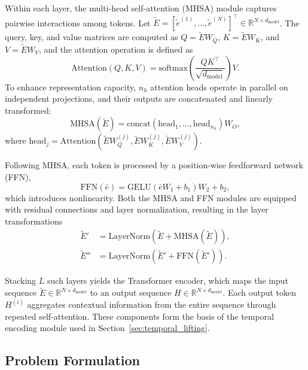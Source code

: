 \documentclass[journal]{IEEEtran}
\begin{document}
Within each layer, the multi-head self-attention (MHSA) module captures pairwise interactions among tokens. Let $\tilde{E} = [\tilde{e}^{(1)}, \ldots, \tilde{e}^{(N)}]^\top \in \mathbb{R}^{N \times d_{\mathrm{model}}}$. The query, key, and value matrices are computed as $Q = \tilde{E}W_Q$, $K = \tilde{E}W_K$, and $V = \tilde{E}W_V$, and the attention operation is defined as
\begin{equation}
    \mathrm{Attention}(Q,K,V)
    = \mathrm{softmax}\!\left(\frac{QK^\top}{\sqrt{d_{\mathrm{model}}}}\right)V.
    \label{eq:attention}
\end{equation}
To enhance representation capacity, $n_h$ attention heads operate in parallel on independent projections, and their outputs are concatenated and linearly transformed:
\begin{equation}
    \mathrm{MHSA}(\tilde{E})
    = \mathrm{concat}\!\left(\mathrm{head}_1, \ldots, \mathrm{head}_{n_h}\right)W_O,
    \label{eq:mhsa}
\end{equation}
where $\mathrm{head}_j = \mathrm{Attention}(\tilde{E}W_Q^{(j)}, \tilde{E}W_K^{(j)}, \tilde{E}W_V^{(j)})$.

Following MHSA, each token is processed by a position-wise feedforward network (FFN),
\begin{equation}
    \mathrm{FFN}(\bar{e}) = \mathrm{GELU}(\bar{e}W_1 + b_1)W_2 + b_2,
    \label{eq:ffn}
\end{equation}
which introduces nonlinearity. Both the MHSA and FFN modules are equipped with residual connections and layer normalization, resulting in the layer transformations
\begin{align}
    \tilde{E}' &= \mathrm{LayerNorm}\!\left(\tilde{E} + \mathrm{MHSA}(\tilde{E})\right), \\
    \tilde{E}'' &= \mathrm{LayerNorm}\!\left(\tilde{E}' + \mathrm{FFN}(\tilde{E}')\right).
\end{align}

Stacking $L$ such layers yields the Transformer encoder, which maps the input sequence $\tilde{E} \in \mathbb{R}^{N \times d_{\mathrm{model}}}$ to an output sequence $H \in \mathbb{R}^{N \times d_{\mathrm{model}}}$. Each output token $H^{(i)}$ aggregates contextual information from the entire sequence through repeated self-attention.
These components form the basis of the temporal encoding module used in Section~\ref{sec:temporal_lifting}.


\subsection{Problem Formulation}
\label{sec:problem}
\end{document}
